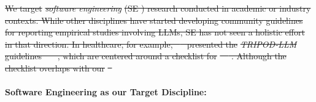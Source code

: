 \documentclass[smallextended]{svjour3}
\newcommand*{\enq}[1]{\enquote{{\itshape#1}}}
\newcommand{\guidelines}{\hyperref[sec:guidelines]{\emph{Guidelines}}\xspace}
\newcommand{\scopeparagraph}[1]{\paragraph{\bfseries #1:}}
\providecommand{\DIFdeltex}[1]{{\protect\color{red}\sout{#1}}}                      %
\providecommand{\DIFaddbegin}{} %
\providecommand{\DIFdelend}{} %
\providecommand{\DIFdel}[1]{\texorpdfstring{\DIFdeltex{#1}}{}} %
\newcommand{\DIFaddincludegraphics}[2][]{{\color{blue}\fbox{\DIFOincludegraphics[#1]{#2}}}} %
\DeclareRobustCommand{\DIFaddbegin}{\DIFOaddbegin \let\includegraphics\DIFaddincludegraphics} %
\DeclareRobustCommand{\DIFdelend}{\DIFOaddend \let\includegraphics\DIFOincludegraphics} %
\begin{document}
\DIFdel{We target }\emph{\DIFdel{software engineering}} %
\DIFdel{(SE ) research conducted in academic or industry contexts.
While other disciplines have started developing community guidelines for reporting empirical studies involving LLMs, SE has not seen a holistic effort in that direction. In healthcare, for example, \mbox{%
\citeauthor{Gallifant2025} }\hskip0pt%
presented the }\emph{\DIFdel{TRIPOD-LLM}} %
\DIFdel{guidelines~\mbox{%
\cite{Gallifant2025} }\hskip0pt%
, which are centered around a checklist for }%
\DIFdel{~\mbox{%
\cite{Gallifant2025}}\hskip0pt%
.
Although the checklist overlaps with our }%
\DIFdel{~}\DIFdelend \DIFaddbegin \scopeparagraph{Software Engineering as our Target Discipline}
\end{document}
